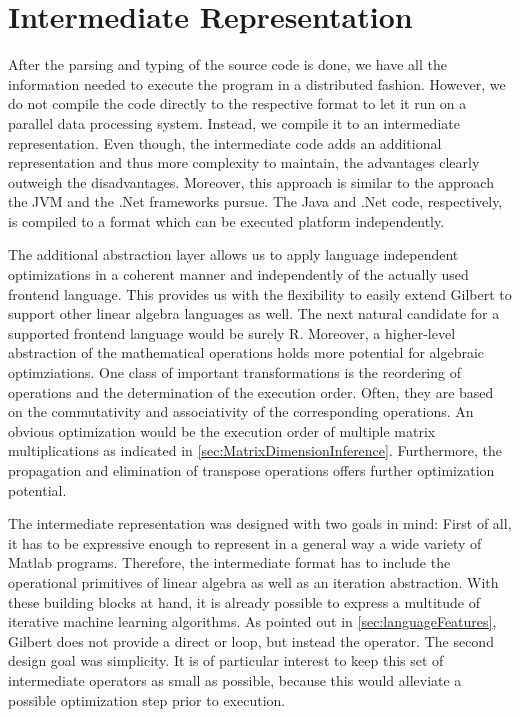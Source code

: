 \chapter{Intermediate Representation}
\label{cha:intermediaterepresentation}


After the parsing and typing of the source code is done, we have all the information needed to execute the program in a distributed fashion.
However, we do not compile the code directly to the respective format to let it run on a parallel data processing system.
Instead, we compile it to an intermediate representation.
Even though, the intermediate code adds an additional representation and thus more complexity to maintain, the advantages clearly outweigh the disadvantages.
Moreover, this approach is similar to the approach the JVM and the .Net frameworks pursue.
The Java and .Net code, respectively, is compiled to a format which can be executed platform independently.

The additional abstraction layer allows us to apply language independent optimizations in a coherent manner and independently of the actually used frontend language.
This provides us with the flexibility to easily extend Gilbert to support other linear algebra languages as well.
The next natural candidate for a supported frontend language would be surely R.
Moreover, a higher-level abstraction of the mathematical operations holds more potential for algebraic optimziations.
One class of important transformations is the reordering of operations and the determination of the execution order.
Often, they are based on the commutativity and associativity of the corresponding operations.
An obvious optimization would be the execution order of multiple matrix multiplications as indicated in \cref{sec:MatrixDimensionInference}.
Furthermore, the propagation and elimination of transpose operations offers further optimization potential.

The intermediate representation was designed with two goals in mind:
First of all, it has to be expressive enough to represent in a general way a wide variety of Matlab programs.
Therefore, the intermediate format has to include the operational primitives of linear algebra as well as an iteration abstraction.
With these building blocks at hand, it is already possible to express a multitude of iterative machine learning algorithms.
As pointed out in \cref{sec:languageFeatures}, Gilbert does not provide a direct  or  loop, but instead the  operator.
The second design goal was simplicity.
It is of particular interest to keep this set of intermediate operators as small as possible, because this would alleviate a possible optimization step prior to execution.

